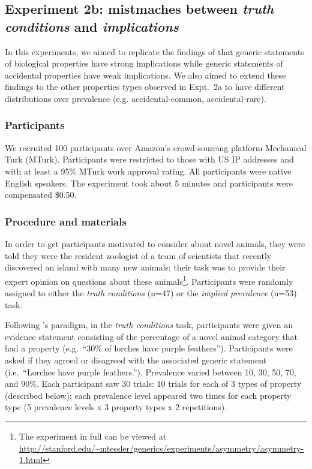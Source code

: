 \documentclass[10pt,letterpaper]{article}
\begin{document}
\subsection{Experiment 2b: mistmaches between \emph{truth conditions} and \emph{implications}}
In this experiments, we aimed to replicate the findings of \citeauthor{Cimpian2010} that generic statements of biological properties have strong implications while generic statements of accidental properties have weak implications. 
We also aimed to extend these findings to the other properties types observed in Expt.~2a to have different distributions over prevalence (e.g. accidental-common, accidental-rare).


\subsubsection{Participants}

We recruited 100 participants over Amazon's crowd-sourcing platform Mechanical Turk (MTurk).  
Participants were restricted to those with US IP addresses and with at least a 95\% MTurk work approval rating. 
All participants were native English speakers. 
The experiment took about 5 minutes and participants were compensated \$0.50.

\subsubsection{Procedure and materials}

In order to get participants motivated to consider about novel animals, they were told they were the resident zoologist of a team of scientists that recently discovered an island with many new animals; their task was to provide their expert opinion on questions about these animals\footnote{The experiment in full can be viewed at \url{http://stanford.edu/~mtessler/generics/experiments/asymmetry/asymmetry-1.html}}. 
Participants were randomly assigned to either the \emph{truth conditions} (n=47) or the \emph{implied prevalence} (n=53) task.

Following \citeauthor{Cimpian2010}'s paradigm, in the \emph{truth conditions} task, participants were given an evidence statement consisting of the percentage of a novel animal category that had a property (e.g.~``30\% of lorches have purple feathers''). 
Participants were asked if they agreed or disagreed with the associated generic statement (i.e.~``Lorches have purple feathers.'').
Prevalence varied between 10, 30, 50, 70, and 90\%.
Each participant saw 30 trials: 10 trials for each of 3 types of property (described below); each prevalence level appeared two times for each property type (5 prevalence levels x 3 property types x 2 repetitions). 
\end{document}
